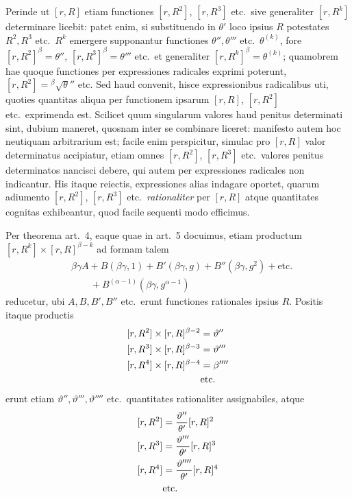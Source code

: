 Perinde ut $[r,R]$ etiam functiones $[r,R^2]$, $[r,R^3]$ etc.\ sive generaliter $[r,R^k]$ determinare licebit: patet enim, si substituendo in $\theta'$ loco ipsius $R$ potestates $R^2,R^3$ etc.\ $R^k$ emergere supponantur functiones $\theta'',\theta'''$ etc.\ $\theta^{(k)}$, fore $[r,R^2]^\beta=\theta''$, $[r,R^3]^\beta=\theta'''$ etc.\ et generaliter $[r,R^k]^\beta=\theta^{(k)}$; quamobrem hae quoque functiones per expressiones radicales exprimi poterunt, $[r,R^2]={}^{\beta}\!\surd\theta''$ etc. Sed haud convenit, hisce expressionibus radicalibus uti, quoties quantitas aliqua per functionem ipsarum $[r,R]$, $[r,R^2]$ etc.\ exprimenda est. Scilicet quum singularum valores haud penitus determinati sint, dubium maneret, quosnam inter se combinare liceret: manifesto autem hoc neutiquam arbitrarium est; facile enim perspicitur, simulac pro $[r,R]$ valor determinatus accipiatur, etiam omnes $[r,R^2]$, $[r,R^3]$ etc.\ valores penitus determinatos nancisci debere, qui autem per expressiones radicales non indicantur. His itaque reiectis, expressiones alias indagare oportet, quarum adiumento $[r,R^2]$, $[r,R^3]$ etc.\ \emph{rationaliter} per $[r,R]$ atque quantitates cognitas exhibeantur, quod facile sequenti modo efficimus.

Per theorema art.\ 4, eaque quae in art.\ 5 docuimus, etiam productum $[r,R^k]\times[r,R]^{\beta-k}$ ad formam talem
\[
\begin{aligned}
&\beta\gamma A+B(\beta\gamma,1)+B'(\beta\gamma,g)+B''(\beta\gamma,g^2)+\text{etc.}\\
&\qquad{}+B^{(\alpha-1)}(\beta\gamma,g^{\alpha-1})
\end{aligned}
\]
reducetur, ubi $A,B,B',B''$ etc.\ erunt functiones rationales ipsius $R$. Positis itaque productis
\[
\begin{aligned}
[r,R^2]\times[r,R]^{\beta-2}&=\vartheta''\\
\relax[r,R^3]\times[r,R]^{\beta-3}&=\vartheta'''\\
\relax[r,R^4]\times[r,R]^{\beta-4}&=\beta''''\\
&\text{etc.}
\end{aligned}
\]
erunt etiam $\vartheta'',\vartheta''',\vartheta''''$ etc.\ quantitates rationaliter assignabiles, atque
\[
\begin{aligned}
[r,R^2]&=\frac{\vartheta''}{\theta'}[r,R]^2\\
\relax[r,R^3]&=\frac{\vartheta'''}{\theta'}[r,R]^3\\
\relax[r,R^4]&=\frac{\vartheta''''}{\theta'}[r,R]^4\\
&\text{etc.}
\end{aligned}
\]


